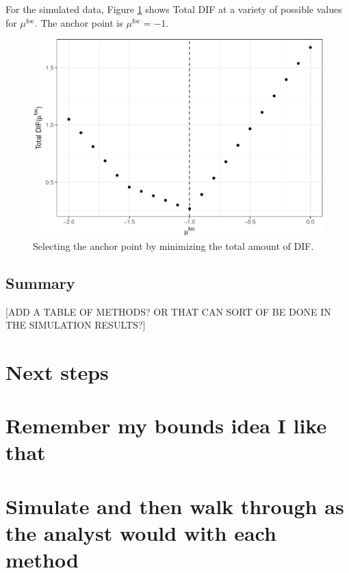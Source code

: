 \documentclass[
  11pt,
]{article}
\begin{document}
For the simulated data, Figure \ref{fig:mabc} shows Total DIF at a variety of possible values for \(\mu^\text{foc}\). The anchor point is \(\mu^\text{foc} = -1\).

\begin{figure}[H]

{\centering \includegraphics[width=0.7\linewidth]{paper_files/figure-latex/mabc-1} 

}

\caption{Selecting the anchor point by minimizing the total amount of DIF.}\label{fig:mabc}
\end{figure}

\hypertarget{summary}{%
\subsection{Summary}\label{summary}}

{[}ADD A TABLE OF METHODS? OR THAT CAN SORT OF BE DONE IN THE SIMULATION RESULTS?{]}

\hypertarget{next-steps}{%
\section{Next steps}\label{next-steps}}

\hypertarget{remember-my-bounds-idea-i-like-that}{%
\section{Remember my bounds idea I like that}\label{remember-my-bounds-idea-i-like-that}}

\hypertarget{simulate-and-then-walk-through-as-the-analyst-would-with-each-method}{%
\section{Simulate and then walk through as the analyst would with each method}\label{simulate-and-then-walk-through-as-the-analyst-would-with-each-method}}
\end{document}
